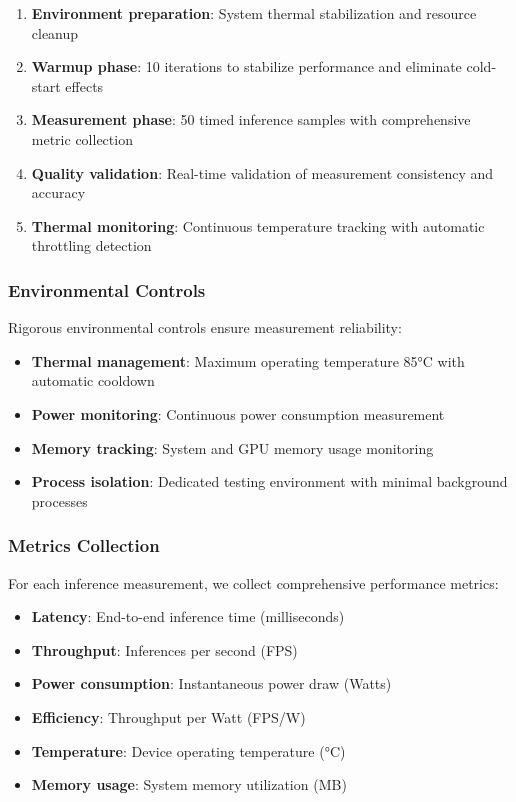 \documentclass[manuscript]{acmart}
\begin{document}
\begin{enumerate}
    \item \textbf{Environment preparation}: System thermal stabilization and resource cleanup
    \item \textbf{Warmup phase}: 10 iterations to stabilize performance and eliminate cold-start effects
    \item \textbf{Measurement phase}: 50 timed inference samples with comprehensive metric collection
    \item \textbf{Quality validation}: Real-time validation of measurement consistency and accuracy
    \item \textbf{Thermal monitoring}: Continuous temperature tracking with automatic throttling detection
\end{enumerate}

\subsubsection{Environmental Controls}
Rigorous environmental controls ensure measurement reliability:

\begin{itemize}
    \item \textbf{Thermal management}: Maximum operating temperature 85°C with automatic cooldown
    \item \textbf{Power monitoring}: Continuous power consumption measurement
    \item \textbf{Memory tracking}: System and GPU memory usage monitoring
    \item \textbf{Process isolation}: Dedicated testing environment with minimal background processes
\end{itemize}

\subsubsection{Metrics Collection}
For each inference measurement, we collect comprehensive performance metrics:

\begin{itemize}
    \item \textbf{Latency}: End-to-end inference time (milliseconds)
    \item \textbf{Throughput}: Inferences per second (FPS)
    \item \textbf{Power consumption}: Instantaneous power draw (Watts)
    \item \textbf{Efficiency}: Throughput per Watt (FPS/W)
    \item \textbf{Temperature}: Device operating temperature (°C)
    \item \textbf{Memory usage}: System memory utilization (MB)
\end{itemize}
\end{document}
